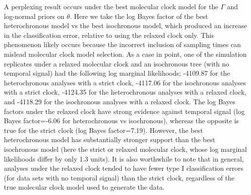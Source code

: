 \documentclass[10pt,letterpaper]{article}
\begin{document}
A perplexing result occurs under the best molecular clock model for the $\Gamma$ and log-normal priors on $\theta$. Here we take the log Bayes factor of the best heterochronous model vs the best isochronous model, which produced an increase in the classification error, relative to using the relaxed clock only. This phenomenon likely occurs because the incorrect inclusion of sampling times can mislead molecular clock model selection. As a case in point, one of the simulation replicates under a relaxed molecular clock and an isochronous tree (with no temporal signal) had the following log marginal likelihoods; -4109.87 for the heterochronous analyses with a strict clock, -4117.06 for the isochronous analyses with a strict clock, -4124.35 for the heterochronous analyses with a relaxed clock, and -4118.29 for the isochronous analyses with a relaxed clock. The log Bayes factors under the relaxed clock have strong evidence against temporal signal (log Bayes factor=-6.06 for heterochronous vs isochronous), whereas the opposite is true for the strict clock (log Bayes factor=7.19). However, the best heterochronous model has substantially stronger support than the best isochronous model (here the strict or relaxed molecular clock, whose log marginal likelihoods differ by only 1.3 units). It is also worthwhile to note that in general, analyses under the relaxed clock tended to have fewer type I classification errors (for data sets with no temporal signal) than the strict clock, regardless of the true molecular clock model used to generate the data.
\end{document}
